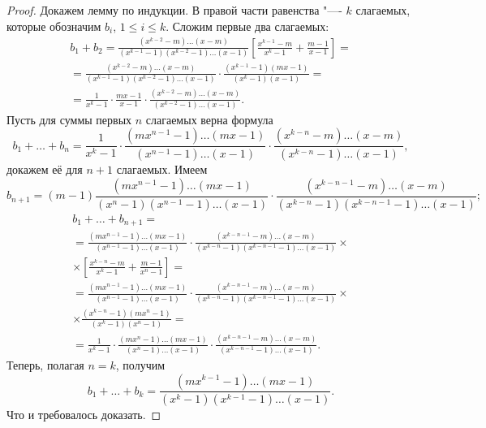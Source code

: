 \smallskip

\begin{proof}
Докажем лемму по индукции. В правой части равенства "---- $k$ слагаемых,
которые обозначим $b_i$, $1 \le i \le k$. Сложим первые два
слагаемых:
\begin{multline*}
b_1 + b_2 = \frac{\left(x^{k - 2} - m\right)\ldots (x -
m)}{\left(x^{k - 1} - 1\right)\left(x^{k - 2} - 1\right)\ldots (x
- 1)}\left[\frac{x^{k - 1} - m}{x^k - 1} + \frac{m - 1}{x -
1}\right] =\\
= \frac{\left(x^{k - 2} - m\right)\ldots (x - m)}{\left(x^{k - 1}
- 1\right)\left(x^{k - 2} - 1\right)\ldots (x - 1)} \cdot
\frac{\left(x^{k - 1} - 1\right) (mx - 1)}{\left(x^k - 1\right) (x
- 1)} =\\
= \frac{1}{x^k - 1} \cdot \frac{mx - 1}{x - 1} \cdot
\frac{\left(x^{k - 2} - m\right)\ldots (x - m)}{\left(x^{k - 2} -
1\right)\ldots (x - 1)}.
\end{multline*}
Пусть для суммы первых $n$ слагаемых верна формула
$$
b_1 + \ldots + b_n = \frac{1}{x^k - 1} \cdot \frac{\left(mx^{n -
1} - 1\right)\ldots(mx - 1)}{\left(x^{n - 1} - 1\right)\ldots (x -
1)} \cdot \frac{\left(x^{k - n} - m\right)\ldots (x -
m)}{\left(x^{k - n} - 1\right)\ldots (x - 1)},
$$
докажем е\"е для $n + 1$ слагаемых. Имеем
$$
b_{n + 1} = (m - 1)\frac{\left(mx^{n - 1} - 1\right)\ldots(mx -
1)}{\left(x^n - 1\right)\left(x^{n - 1} - 1\right)\ldots(x - 1)}
\cdot \frac{\left(x^{k - n - 1} - m\right)\ldots (x -
m)}{\left(x^{k - n} - 1\right)\left(x^{k - n - 1} - 1\right)\ldots
(x - 1)};
$$
\begin{multline*}
b_1 + \ldots + b_{n + 1} =\\
= \frac{\left(mx^{n - 1} - 1\right)\ldots (mx - 1)}{\left(x^{n -
1} - 1\right)\ldots (x - 1)} \cdot \frac{\left(x^{k - n - 1} -
m\right)\ldots (x - m)}{\left(x^{k - n} - 1\right)\left(x^{k - n -
1} - 1\right)\ldots (x - 1)}\times\\
\times \left[\frac{x^{k - n} - m}{x^k - 1} +
\frac{m - 1}{x^n - 1}\right] =\\
= \frac{\left(mx^{n - 1} - 1\right)\ldots (mx - 1)}{\left(x^{n -
1} - 1\right)\ldots (x - 1)} \cdot \frac{\left(x^{k - n - 1} -
m\right)\ldots (x - m)}{\left(x^{k - n} - 1\right)\left(x^{k - n -
1} - 1\right)\ldots (x - 1)} \times \\
\times \frac{\left(x^{k - n} - 1\right)\left(mx^n -
1\right)}{\left(x^k - 1\right)\left(x^n - 1\right)} = \\
= \frac{1}{x^k - 1} \cdot \frac{\left(mx^n - 1\right)\ldots (mx -
1)}{\left(x^n - 1\right)\ldots (x - 1)} \cdot \frac{\left(x^{k - n
- 1} - m\right)\ldots (x - m)}{\left(x^{k - n - 1} -
1\right)\ldots (x - 1)}.
\end{multline*}
Теперь, полагая $n = k$, получим
$$
b_1 + \ldots + b_k = \frac{\left(mx^{k - 1} - 1\right)\ldots (mx -
1)}{\left(x^k - 1\right)\left(x^{k - 1} - 1\right)\ldots (x -
1)}.
$$
Что и требовалось доказать.
\end{proof}
\smallskip

